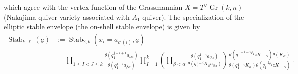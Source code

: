 \begin{proposition}
    which agree with the vertex function of the Grassmannian $X = T^\vee\!\operatorname{Gr}(k,n)$ (Nakajima quiver variety associated with $A_1$ quiver).
    The specialization of the elliptic stable envelope (the on-shell stable envelope) is given by
\begin{align}
    \operatorname{Stab}_{\underline{k};\underline{\ell}}(\underline{a}) & := \operatorname{Stab}_{2,\underline{k}}(x_i = a_{c'(i)},\underline{a})
    \nonumber \\
    & = \prod_{1 \le I < J \le k} \frac{\theta(q_1^{j-i+1} a_{\beta\alpha})}{\theta(q_1^{j-i} a_{\beta\alpha})} \prod_{I=1}^k 
    \left(
    \prod_{\beta < \alpha} \frac{\theta(q_1^{1-i} a_{\beta\alpha})}{\theta(q_1^{1-i} K_\beta a_{\beta\alpha})}
    \right)
    \frac{\theta(q_1^{1-i-2\rho_I} z K_{1\ldots \alpha}) \theta(K_{\alpha})}{\theta(q_1^{1-i} K_{\alpha}) \theta(q_1^{-2\rho_I} z K_{1\ldots \alpha})}
    \, .
\end{align}

\end{proposition}
